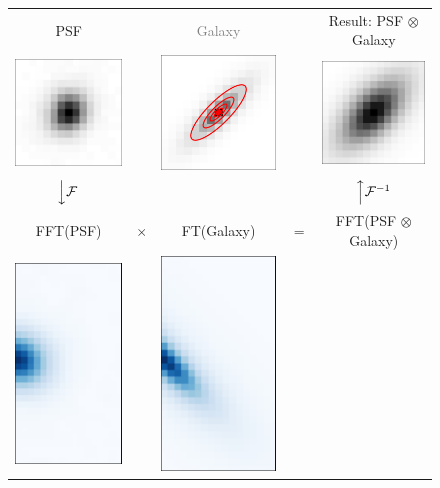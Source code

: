 \documentclass[11pt,preprint]{aastex}
\newcommand{\conv}{\otimes}
\newcommand{\gray}[1]{\textcolor{gray}{#1}}
\begin{document}
\begin{figure}
  \newcommand{\arrowspacer}[1]{\left#1 \textrm{\rule[-0.5em]{0pt}{1em}} \right.}
  \begin{center}
    \begin{tabular}{@{}c@{}c@{}c@{}c@{}c@{}}
      PSF && \gray{Galaxy} && Result: PSF $\conv$ Galaxy \\
      \multicolumn{1}{r}{%
        \includegraphics[height=0.22\textwidth]{psf-00}%
      }
      &&
      \multicolumn{1}{r}{%
        \includegraphics[height=0.22\textwidth]{psf-04}%
      }
      &&
      \multicolumn{1}{r}{%
        \includegraphics[height=0.22\textwidth]{psf-05}%
      } \\
      \rule[-1em]{0pt}{1.5em}
      $\arrowspacer{\downarrow \mathcal{F}}$ && && $\arrowspacer{\uparrow \mathcal{F}^{-1}}$ \\
      FFT(PSF) & $\times$ & FT(Galaxy) & $=$ & FFT(PSF $\conv$ Galaxy) \\
      \multicolumn{1}{r}{%
        \includegraphics[height=0.22\textwidth]{psf-01}} &
      &
      \multicolumn{1}{r}{%
        \includegraphics[height=0.22\textwidth]{psf-02}} &

\end{tabular}
\end{center}
\end{figure}
\end{document}
